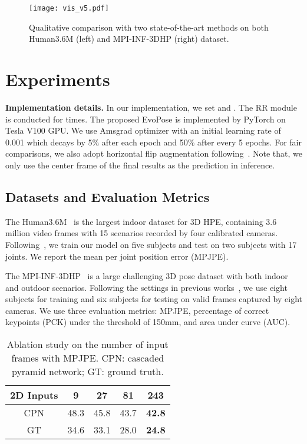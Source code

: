 \documentclass{article}
\begin{document}
\begin{figure*}[t]
  \setlength{\abovecaptionskip}{0cm}
  \setlength{\belowcaptionskip}{-0.2cm}
\centering
  \centerline{\texttt{[image: vis\_v5.pdf]}}
\caption{Qualitative comparison with two state-of-the-art methods on both Human3.6M (left) and MPI-INF-3DHP (right) dataset.}
\label{fig:vis}
\end{figure*}

\section{Experiments}\label{sec:experiments}
{\bf Implementation details.} 
In our implementation, we set  and .  The RR module is conducted for  times. The proposed EvoPose is implemented by PyTorch on Tesla V100 GPU. We use Amsgrad optimizer with an initial learning rate of 0.001 which decays by 5\% after each epoch and 50\% after every 5 epochs. 
For fair comparisons, we also adopt horizontal flip augmentation following~\cite{zheng20213d,pavllo20193d,chen2021anatomy}. Note that, we only use the center frame of the final results as the prediction in inference.

\subsection{Datasets and Evaluation Metrics} The Human3.6M~\cite{h36m_pami} is the largest indoor dataset for 3D HPE, containing 3.6 million video frames with 15 scenarios recorded by four calibrated cameras. Following~\cite{chen2021anatomy,zheng20213d,li2022mhformer,shan2022p}, we train our model on five subjects and test on two subjects with 17 joints. We report the mean per joint position error (MPJPE).

 The MPI-INF-3DHP~\cite{mono-3dhp2017} is a large challenging 3D pose dataset with both indoor and outdoor scenarios. Following the settings in previous works~\cite{zheng20213d,li2022mhformer,shan2022p}, we use eight subjects for training and six subjects for testing on valid frames captured by eight cameras. We use three evaluation metrics: MPJPE, percentage of correct keypoints (PCK) under the threshold of 150mm, and area under curve (AUC).

\begin{table}[t]\footnotesize
    \setlength{\abovecaptionskip}{0cm}
    \setlength{\belowcaptionskip}{-0.3cm}
    \caption{Ablation study on the number of input frames with MPJPE. CPN: cascaded pyramid network; GT: ground truth.}
    \label{tab:receptive}
    \centering
    \begin{tabular}{ccccc}
        \toprule
        2D Inputs & 9 & 27 & 81 & 243 \\
        \midrule
        CPN & 48.3 & 45.8 & 43.7 & {\bf 42.8} \\
        GT & 34.6 & 33.1 & 28.0 & {\bf 24.8} \\
        \bottomrule
    \end{tabular}
\end{table}
\end{document}
